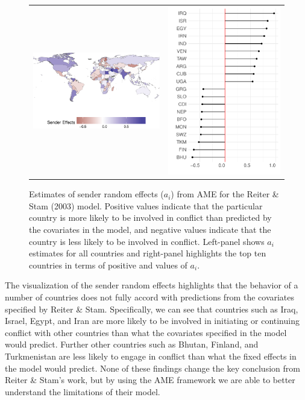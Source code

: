 \begin{figure}[ht]
	\begin{tabular}{cc}
	\includegraphics[width=.7\textwidth]{graphics/reiter_stam_aEff_map.pdf} &
	\includegraphics[width=.3\textwidth]{graphics/reiter_stam_aEff_line.pdf} \\
	\end{tabular}
	\caption{Estimates of sender random effects ($a_{i}$) from AME for the Reiter \& Stam (2003) model. Positive values indicate that the particular country is more likely to be involved in conflict than predicted by the covariates in the model, and negative values indicate that the country is less likely to be involved in conflict. Left-panel shows $a_{i}$ estimates for all countries and right-panel highlights the top ten countries in terms of positive and values of $a_{i}$.}
	\label{fig:reiter_stam_aEff}
\end{figure}
\FloatBarrier

The visualization of the sender random effects highlights that the behavior of a number of countries does not fully accord with predictions from the covariates specified by Reiter \& Stam. Specifically, we can see that countries such as Iraq, Israel, Egypt, and Iran are more likely to be involved in initiating or continuing conflict with other countries than what the covariates specified in the model would predict. Further other countries such as Bhutan, Finland, and Turkmenistan are less likely to engage in conflict than what the fixed effects in the model would predict. None of these findings change the key conclusion from Reiter \& Stam's work, but by using the AME framework we are able to better understand the limitations of their model.

